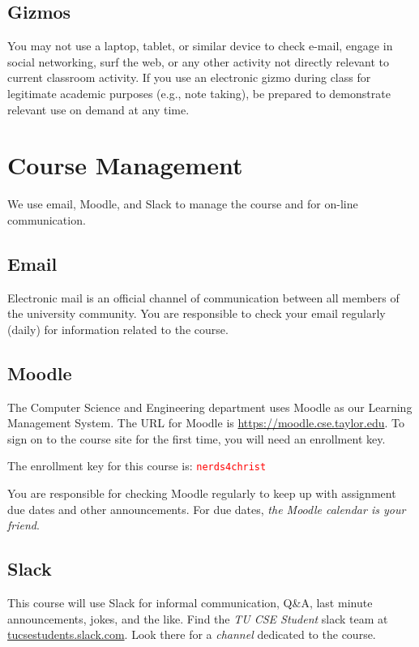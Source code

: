 \subsection{Gizmos}

You may not use a laptop, tablet, or similar device to check e-mail, engage in social
networking, surf the web, or any other activity not directly relevant
to current classroom activity.
If you use an electronic gizmo during class for legitimate academic purposes
(e.g., note taking), be prepared to demonstrate relevant use on demand
at any time.

\section{Course Management}

We use email, Moodle, and Slack to manage the course
and for on-line communication.

\subsection{Email}

Electronic mail is an official channel of communication
between all members of the university community.
You are responsible to check your email regularly
(daily)
for information related to the course.

\subsection{Moodle}

The Computer Science and Engineering department uses Moodle
as our Learning Management System.
The URL for Moodle is \url{https://moodle.cse.taylor.edu}.
To sign on to the course site for the first time,
you will need an enrollment key.
\begin{flushleft}
  \begin{framed}
    The enrollment key for this course is:
    \textcolor{red}{\texttt{nerds4christ}}
  \end{framed}
\end{flushleft}
You are responsible for checking Moodle regularly
to keep up with assignment due dates and other announcements.
For due dates, \emph{the Moodle calendar is your friend}.

\subsection{Slack}

This course will use Slack
for informal communication,
Q\&A,
last minute announcements,
jokes,
and the like.
Find the \emph{TU CSE Student} slack team at
\url{tucsestudents.slack.com}.
Look there for a \emph{channel}
dedicated to the course.


